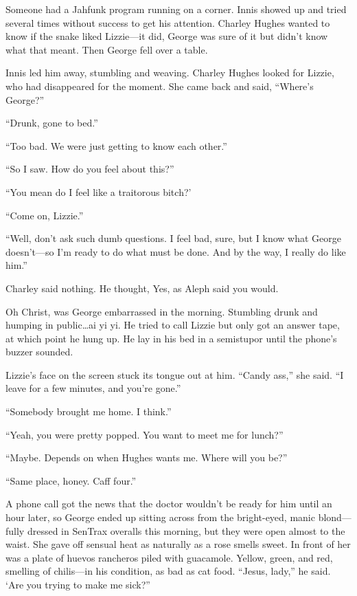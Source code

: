 Someone had a Jahfunk program running on a corner. Innis showed up and tried several times without success to get his attention. Charley Hughes wanted to know if the snake liked Lizzie—it did, George was sure of it but didn't know what that meant. Then George fell over a table.

Innis led him away, stumbling and weaving. Charley Hughes looked for Lizzie, who had disappeared for the moment. She came back and said, ``Where's George?''

``Drunk, gone to bed.''

``Too bad. We were just getting to know each other.''

``So I saw. How do you feel about this?''

``You mean do I feel like a traitorous bitch?'

``Come on, Lizzie.''

``Well, don't ask such dumb questions. I feel bad, sure, but I know what George doesn't—so I'm ready to do what must be done. And by the way, I really do like him.''

Charley said nothing. He thought, Yes, as Aleph said you would.

Oh Christ, was George embarrassed in the morning. Stumbling drunk and humping in public\ldots ai yi yi. He tried to call Lizzie but only got an answer tape, at which point he hung up. He lay in his bed in a semistupor until the phone's buzzer sounded.

Lizzie's face on the screen stuck its tongue out at him. ``Candy ass,'' she said. ``I leave for a few minutes, and you're gone.''

``Somebody brought me home. I think.''

``Yeah, you were pretty popped. You want to meet me for lunch?''

``Maybe. Depends on when Hughes wants me. Where will you be?''

``Same place, honey. Caff four.''

A phone call got the news that the doctor wouldn't be ready for him until an hour later, so George ended up sitting across from the bright-eyed, manic blond—fully dressed in SenTrax overalls this morning, but they were open almost to the waist. She gave off sensual heat as naturally as a rose smells sweet. In front of her was a plate of huevos rancheros piled with guacamole. Yellow, green, and red, smelling of chilis—in his condition, as bad as cat food. ``Jesus, lady,'' he said. ‘Are you trying to make me sick?''

